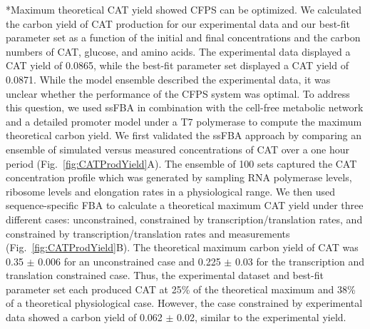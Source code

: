 \documentclass[12pt]{article}
\makeatletter
\renewcommand\subsection{\@startsection
	{subsection}{2}{0mm}
	{-0.05in}
	{-0.5\baselineskip}
	{\normalfont\normalsize\bfseries}}
\makeatother
\begin{document}
\subsection*{Maximum theoretical CAT yield showed CFPS can be optimized.}
We calculated the carbon yield of CAT production for our experimental data and our best-fit parameter set as a function of the initial and final concentrations and the carbon numbers of CAT, glucose, and amino acids.
The experimental data displayed a CAT yield of 0.0865, while the best-fit parameter set displayed a CAT yield of 0.0871.
While the model ensemble described the experimental data, it was unclear whether the performance of the CFPS system was optimal.
To address this question, we used ssFBA in combination with the cell-free metabolic network and a detailed promoter model under a T7 polymerase to compute the maximum theoretical carbon yield.
We first validated the ssFBA approach by comparing an ensemble of simulated versus measured concentrations of CAT over a one hour period (Fig.~\ref{fig:CATProdYield}A). 
The ensemble of 100 sets captured the CAT concentration profile which was generated by sampling RNA polymerase levels, ribosome levels and elongation rates in a physiological range.
We then used sequence-specific FBA to calculate a theoretical maximum CAT yield under three different cases: unconstrained, constrained by transcription/translation rates, and constrained by transcription/translation rates and measurements (Fig.~\ref{fig:CATProdYield}B).
The theoretical maximum carbon yield of CAT was 0.35 $\pm$ 0.006 for an unconstrained case and 0.225 $\pm$ 0.03 for the transcription and translation constrained case.
Thus, the experimental dataset and best-fit parameter set each produced CAT at 25\% of the theoretical maximum and 38\% of a theoretical physiological case.
However, the case constrained by experimental data showed a carbon yield of 0.062 $\pm$ 0.02, similar to the experimental yield. 
\end{document}

